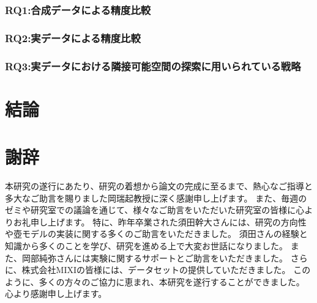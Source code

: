 \documentclass[uplatex,11pt,openany]{ujreport}
\renewcommand{\bibname}{参考文献}
\begin{document}
        \subsection{RQ1:合成データによる精度比較}


        \subsection{RQ2:実データによる精度比較}

        \subsection{RQ3:実データにおける隣接可能空間の探索に用いられている戦略}


\chapter{結論}



\chapter*{謝辞}
    本研究の遂行にあたり、研究の着想から論文の完成に至るまで、熱心なご指導と多大なご助言を賜りました岡瑞起教授に深く感謝申し上げます。
    また、毎週のゼミや研究室での議論を通じて、様々なご助言をいただいた研究室の皆様に心よりお礼申し上げます。
    特に、昨年卒業された須田幹大さんには、研究の方向性や壺モデルの実装に関する多くのご助言をいただきました。
    須田さんの経験と知識から多くのことを学び、研究を進める上で大変お世話になりました。
    また、岡部純弥さんには実験に関するサポートとご助言をいただきました。
    さらに、株式会社MIXIの皆様には、データセットの提供していただきました。
    このように、多くの方々のご協力に恵まれ、本研究を遂行することができました。
    心より感謝申し上げます。


\newpage


% 
% 





\end{document}
